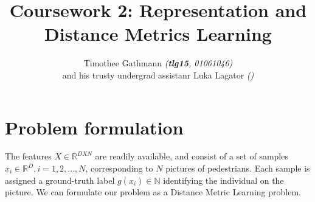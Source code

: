 \documentclass[10pt,technote]{IEEEtran}
\title{Coursework 2: Representation and Distance Metrics Learning }
\author{Timothee Gathmann \textit{(\textbf{tlg15}, 01061046)}\\ and his trusty undergrad assistanr Luka Lagator\textit{ ()}}
\begin{document}
\maketitle

\section{Problem formulation}
The features $X \in \mathbb{R}^{D X N}$ are readily available, and consist of a set of samples $x_i \in \mathbb{R}^D, i = 1, 2, ..., N$, corresponding to $N$ pictures of pedestrians. Each sample is assigned a ground-truth label $g(x_i) \in \mathbb{N}$ identifying the individual on the picture. 
We can formulate our problem as a Distance Metric Learning problem.
\end{document}
